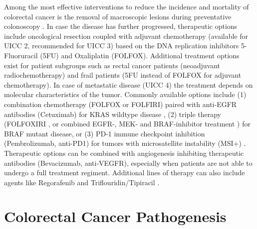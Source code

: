 \begin{flushleft}
Among the most effective interventions to reduce the incidence and mortality of colorectal cancer is the removal of macroscopic lesions during preventative colonoscopy \cite{Nishihara2013Long-TermEndoscopy}. In case the disease has further progressed, therapeutic options include oncological resection coupled with adjuvant chemotherapy (available for UICC 2, recommended for UICC 3) based on the DNA replication inhibitors 5-Fluoruracil (5FU) and Oxaliplatin (FOLFOX). Additional treatment options exist for patient subgroups such as rectal cancer patients (neoadjuvant radiochemotherapy) and frail patients (5FU instead of FOLFOX for adjuvant chemotherapy). In case of metastatic disease (UICC 4) the treatment depends on molecular characteristics of the tumor. Commonly available options include (1) combination chemotherapy (FOLFOX or FOLFIRI) paired with anti-EGFR antibodies (Cetuximab) for KRAS wildtype disease \cite{vancutsemESMOConsensusGuidelines2016a}, (2) triple therapy (FOLFOXIRI \cite{vancutsemESMOConsensusGuidelines2016a}, or combined EGFR-, MEK- and BRAF-inhibitor treatment \cite{kopetzEncorafenibBinimetinibCetuximab2019}) for BRAF mutant disease, or (3) PD-1 immune checkpoint inhibition (Pembrolizumab, anti-PD1) for tumors with microsatellite instability (MSI+) \cite{PembrolizumabMicrosatelliteInstabilityHigh}. Therapeutic options can be combined with angiogenesis inhibiting therapeutic antibodies (Bevacizumab, anti-VEGFR), especially when patients are not able to undergo a full treatment regiment. Additional lines of therapy can also include agents like Regorafenib and Triflouridin/Tipiracil \cite{vancutsemESMOConsensusGuidelines2016a}. 
\par

\section{Colorectal Cancer Pathogenesis}


\end{flushleft}
